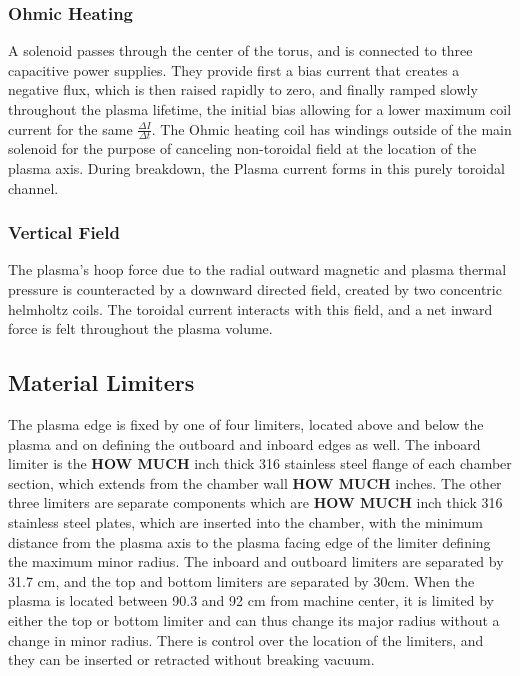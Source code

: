 \subsubsection{Ohmic Heating}
A solenoid passes through the center of the torus, and is connected to three capacitive power supplies.  They provide first a bias current that creates a negative flux, which is then raised rapidly to zero, and finally ramped slowly throughout the plasma lifetime, the initial bias allowing for a lower maximum coil current for the same $\frac{\Delta I}{\Delta t}$.  The Ohmic heating coil has windings outside of the main solenoid for the purpose of canceling non-toroidal field at the location of the plasma axis.  During breakdown, the Plasma current forms in this purely toroidal channel.
\subsubsection{Vertical Field}
The plasma's hoop force due to the radial outward magnetic and plasma thermal pressure is counteracted by a downward directed field, created by two concentric helmholtz coils.  The toroidal current interacts with this field, and a net inward force is felt throughout the plasma volume.
\subsection{Material Limiters}
The plasma edge is fixed by one of four limiters, located above and below the plasma and on defining the outboard and inboard edges as well.  The inboard limiter is the \textbf{HOW MUCH} inch thick 316 stainless steel flange of each chamber section, which extends from the chamber wall \textbf{HOW MUCH} inches.  The other three limiters are separate components which are \textbf{HOW MUCH} inch thick 316 stainless steel plates, which are inserted into the chamber, with the minimum distance from the plasma axis to the plasma facing edge of the limiter defining the maximum minor radius.  The inboard and outboard limiters are separated by 31.7 cm, and the top and bottom limiters are separated by 30cm.  When the plasma is located between 90.3 and 92 cm from machine center, it is limited by either the top or bottom limiter and can thus change its major radius without a change in minor radius.  There is control over the location of the limiters, and they can be inserted or retracted without breaking vacuum.

